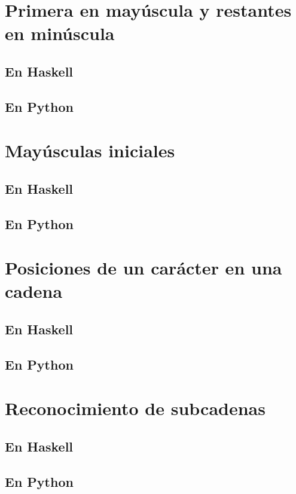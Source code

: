 \documentclass[a4paper,12pt,twoside]{book}
\begin{document}
\section{Primera en mayúscula y restantes en minúscula}
\subsection*{En Haskell}
\subsection*{En Python}

\section{Mayúsculas iniciales}
\subsection*{En Haskell}
\subsection*{En Python}

\section{Posiciones de un carácter en una cadena}
\subsection*{En Haskell}
\subsection*{En Python}

\section{Reconocimiento de subcadenas}
\subsection*{En Haskell}
\subsection*{En Python}
\end{document}
